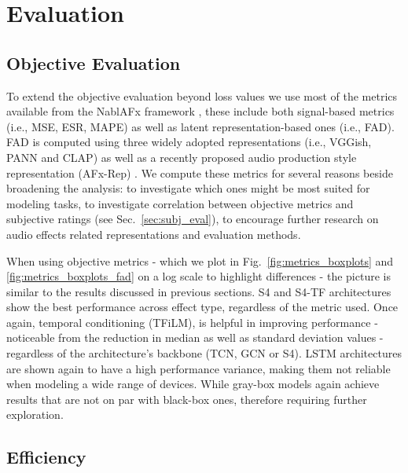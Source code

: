 \section{Evaluation}
\label{sec:eval}

\subsection{Objective Evaluation}
\label{sec:obj_eval}
% 
% 
% 

To extend the objective evaluation beyond loss values we use most of the metrics available from the NablAFx framework \citep{comunità2025nablafxframeworkdifferentiableblackbox}, these include both signal-based metrics (i.e., MSE, ESR, MAPE) as well as latent representation-based ones (i.e., FAD). 
FAD is computed using three widely adopted representations (i.e., VGGish, PANN and CLAP) as well as a recently proposed audio production style representation (AFx-Rep) \cite{steinmetz2024st}.
We compute these metrics for several reasons beside broadening the analysis: to investigate which ones might be most suited for modeling tasks, to investigate correlation between objective metrics and subjective ratings (see Sec.~\ref{sec:subj_eval}), to encourage further research on audio effects related representations and evaluation methods.

When using objective metrics - which we plot in Fig.~\ref{fig:metrics_boxplots} and \ref{fig:metrics_boxplots_fad} on a log scale to highlight differences - the picture is similar to the results discussed in previous sections.
S4 and S4-TF architectures show the best performance across effect type, regardless of the metric used.
Once again, temporal conditioning (TFiLM), is helpful in improving performance - noticeable from the reduction in median as well as standard deviation values - regardless of the architecture's backbone (TCN, GCN or S4).
LSTM architectures are shown again to have a high performance variance, making them not reliable when modeling a wide range of devices.
While gray-box models again achieve results that are not on par with black-box ones, therefore requiring further exploration.

\subsection{Efficiency}
\label{sec:efficiency}

